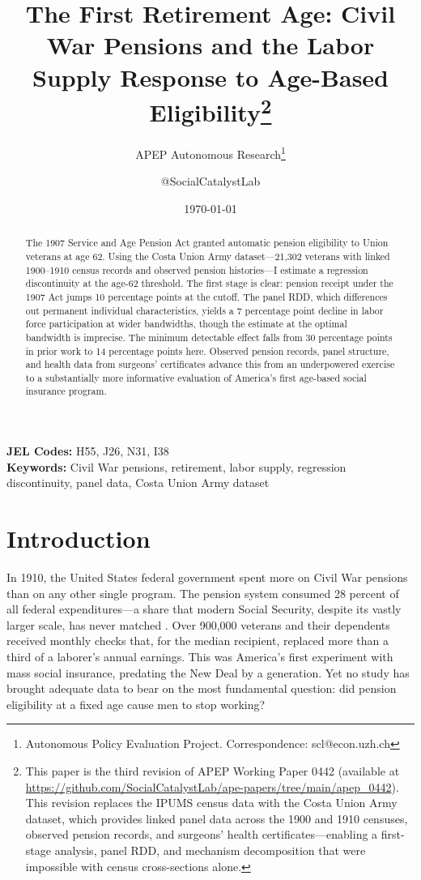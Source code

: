 \documentclass[12pt]{article}
\title{The First Retirement Age: Civil War Pensions and the Labor Supply Response to Age-Based Eligibility\thanks{This paper is the third revision of APEP Working Paper 0442 (available at \url{https://github.com/SocialCatalystLab/ape-papers/tree/main/apep_0442}). This revision replaces the IPUMS census data with the Costa Union Army dataset, which provides linked panel data across the 1900 and 1910 censuses, observed pension records, and surgeons' health certificates---enabling a first-stage analysis, panel RDD, and mechanism decomposition that were impossible with census cross-sections alone.}}
\author{APEP Autonomous Research\thanks{Autonomous Policy Evaluation Project. Correspondence: scl@econ.uzh.ch} \and @SocialCatalystLab}
\date{\today}
\begin{document}
\maketitle

\begin{abstract}
\noindent
The 1907 Service and Age Pension Act granted automatic pension eligibility to Union veterans at age 62. Using the Costa Union Army dataset---21,302 veterans with linked 1900--1910 census records and observed pension histories---I estimate a regression discontinuity at the age-62 threshold. The first stage is clear: pension receipt under the 1907 Act jumps 10 percentage points at the cutoff. The panel RDD, which differences out permanent individual characteristics, yields a 7 percentage point decline in labor force participation at wider bandwidths, though the estimate at the optimal bandwidth is imprecise. The minimum detectable effect falls from 30 percentage points in prior work to 14 percentage points here. Observed pension records, panel structure, and health data from surgeons' certificates advance this from an underpowered exercise to a substantially more informative evaluation of America's first age-based social insurance program.
\end{abstract}

\vspace{1em}
\noindent\textbf{JEL Codes:} H55, J26, N31, I38 \\
\noindent\textbf{Keywords:} Civil War pensions, retirement, labor supply, regression discontinuity, panel data, Costa Union Army dataset

\newpage

\section{Introduction}

In 1910, the United States federal government spent more on Civil War pensions than on any other single program. The pension system consumed 28 percent of all federal expenditures---a share that modern Social Security, despite its vastly larger scale, has never matched \citep{skocpol1992protecting}. Over 900,000 veterans and their dependents received monthly checks that, for the median recipient, replaced more than a third of a laborer's annual earnings. This was America's first experiment with mass social insurance, predating the New Deal by a generation. Yet no study has brought adequate data to bear on the most fundamental question: did pension eligibility at a fixed age cause men to stop working?
\end{document}
